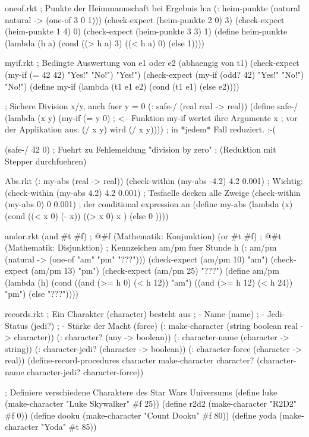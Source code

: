 \begin{filecontents*}{oneof.rkt}
; Punkte der Heimmannschaft bei Ergebnis h:a
(: heim-punkte (natural natural -> (one-of 3 0 1)))
(check-expect (heim-punkte 2 0) 3)
(check-expect (heim-punkte 1 4) 0)
(check-expect (heim-punkte 3 3) 1)
(define heim-punkte
  (lambda (h a)
    (cond ((> h a) 3)
          ((< h a) 0)
          (else    1))))
\end{filecontents*}
\begin{filecontents*}{myif.rkt}
; Bedingte Auswertung von e1 oder e2 (abhaengig von t1)
(check-expect (my-if (= 42 42) "Yes!" "No!") "Yes!")
(check-expect (my-if (odd? 42) "Yes!" "No!") "No!")
(define my-if
  (lambda (t1 e1 e2)
    (cond (t1 e1)
          (else e2))))

; Sichere Division x/y, auch fuer y = 0
(: safe-/ (real real -> real))
(define safe-/
  (lambda (x y)
    (my-if (= y 0)     ; <-- Funktion my-if wertet ihre Argumente
           x           ;     vor der Applikation aus: (/ x y) wird
           (/ x y))))  ;     in *jedem* Fall reduziert. :-(


(safe-/ 42 0)          ; Fuehrt zu Fehlemeldung "division by zero"
                       ; (Reduktion mit Stepper durchfuehren)
\end{filecontents*}
\begin{filecontents*}{Abs.rkt}
(: my-abs (real -> real))
(check-within (my-abs -4.2) 4.2 0.001)   ; Wichtig:
(check-within (my-abs 4.2) 4.2 0.001)    ; Tesfaelle decken alle Zweige
(check-within (my-abs 0) 0 0.001)        ; der conditional expression an
(define my-abs
  (lambda (x)
    (cond ((< x 0) (- x))
          ((> x 0) x    )
          (else    0    ))))
\end{filecontents*}
\begin{filecontents*}{andor.rkt}
(and #t #f)  ; @\eval@ #f   (Mathematik: Konjunktion)
(or #t #f)   ; @\eval@ #t   (Mathematik: Disjunktion)
; Kennzeichen am/pm fuer Stunde h
(: am/pm (natural -> (one-of "am" "pm" "???")))
(check-expect (am/pm 10) "am")
(check-expect (am/pm 13) "pm")
(check-expect (am/pm 25) "???")
(define am/pm
  (lambda (h)
    (cond ((and (>= h 0) (< h 12))  "am")
          ((and (>= h 12) (< h 24)) "pm")
          (else "???"))))
\end{filecontents*}
\begin{filecontents*}{records.rkt}
; Ein Charakter (character) besteht aus
; - Name (name)
; - Jedi-Status (jedi?)
; - Stärke der Macht (force)
(: make-character (string boolean real -> character))
(: character? (any -> boolean))
(: character-name (character -> string))
(: character-jedi? (character -> boolean))
(: character-force (character -> real))
(define-record-procedures character
  make-character
  character?
  (character-name
   character-jedi?
   character-force))


; Definiere verschiedene Charaktere des Star Wars Universums
(define luke
  (make-character "Luke Skywalker" #f 25))
(define r2d2
  (make-character "R2D2" #f 0))
(define dooku
  (make-character "Count Dooku" #f 80))
(define yoda
  (make-character "Yoda" #t 85))
\end{filecontents*}
